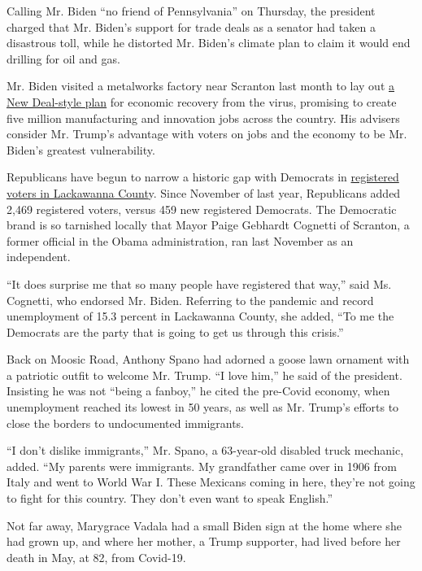 Calling Mr. Biden ``no friend of Pennsylvania'' on Thursday, the
president charged that Mr. Biden's support for trade deals as a senator
had taken a disastrous toll, while he distorted Mr. Biden's climate plan
to claim it would end drilling for oil and gas.

Mr. Biden visited a metalworks factory near Scranton last month to lay
out
\href{https://www.nytimes3xbfgragh.onion/2020/07/09/us/politics/biden-buy-american.html}{a
New Deal-style plan} for economic recovery from the virus, promising to
create five million manufacturing and innovation jobs across the
country. His advisers consider Mr. Trump's advantage with voters on jobs
and the economy to be Mr. Biden's greatest vulnerability.

Republicans have begun to narrow a historic gap with Democrats in
\href{https://www.dos.pa.gov/VotingElections/OtherServicesEvents/VotingElectionStatistics/Pages/VotingElectionStatistics.aspx}{registered
voters in Lackawanna Count}y. Since November of last year, Republicans
added 2,469 registered voters, versus 459 new registered Democrats. The
Democratic brand is so tarnished locally that Mayor Paige Gebhardt
Cognetti of Scranton, a former official in the Obama administration, ran
last November as an independent.

``It does surprise me that so many people have registered that way,''
said Ms. Cognetti, who endorsed Mr. Biden. Referring to the pandemic and
record unemployment of 15.3 percent in Lackawanna County, she added,
``To me the Democrats are the party that is going to get us through this
crisis.''

Back on Moosic Road, Anthony Spano had adorned a goose lawn ornament
with a patriotic outfit to welcome Mr. Trump. ``I love him,'' he said of
the president. Insisting he was not ``being a fanboy,'' he cited the
pre-Covid economy, when unemployment reached its lowest in 50 years, as
well as Mr. Trump's efforts to close the borders to undocumented
immigrants.

``I don't dislike immigrants,'' Mr. Spano, a 63-year-old disabled truck
mechanic, added. ``My parents were immigrants. My grandfather came over
in 1906 from Italy and went to World War I. These Mexicans coming in
here, they're not going to fight for this country. They don't even want
to speak English.''

Not far away, Marygrace Vadala had a small Biden sign at the home where
she had grown up, and where her mother, a Trump supporter, had lived
before her death in May, at 82, from Covid-19.


